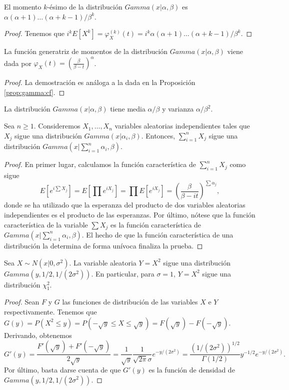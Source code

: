 \documentclass{article}
\begin{document}
\begin{cor}
    El momento $k$-ésimo de la distribución $Gamma(x|\alpha,\beta)$ es $\alpha (\alpha+1) \ldots (\alpha + k -1) / \beta^k$.
\end{cor}
\begin{proof}
    Tenemos que $i^k E[X^k]= \varphi_X^{(k)}(t) = i^k \alpha (\alpha+1) \ldots (\alpha + k -1) / \beta^k$.
\end{proof}

\begin{prop}
    La función generatriz de momentos de la distribución $Gamma(x|\alpha, \beta)$ viene dada por $\varphi_X(t) = \left(\frac{\beta}{\beta - t}\right)^\alpha$.
\end{prop}
\begin{proof}
    La demostración es análoga a la dada en la Proposición \ref{prop:gamma:cf}.
\end{proof}

\begin{cor}
    La distribución $Gamma(x|\alpha,\beta)$ tiene media $\alpha / \beta$ y varianza $\alpha / \beta^2$.
\end{cor}

\begin{prop}
    Sea $n \ge 1$. Consideremos $X_1, \ldots, X_n$ variables aleatorias independientes tales que $X_j$ sigue una distribución $Gamma(x|\alpha_i, \beta)$. Entonces, $\sum_{i=1}^n X_j$ sigue una distribución $Gamma(x|\sum_{i=1}^n \alpha_i, \beta)$.
\end{prop}
\begin{proof}
    En primer lugar, calculamos la función característica de $\sum_{i=1}^n X_j$ como sigue
    \[E[e^{i\sum X_j}] = E[\prod e^{iX_j}] = \prod E[e^{iX_j}] = \left(\frac{\beta}{\beta - it}\right)^{\sum \alpha_j},\]
    donde se ha utilizado que la esperanza del producto de dos variables aleatorias independientes es el producto de las esperanzas. Por último, nótese que la función característica de la variable $\sum X_j$ es la función característica de $Gamma(x|\sum_{i=1}^n \alpha_i, \beta)$. El hecho de que la función característica de una distribución la determina de forma unívoca finaliza la prueba.
\end{proof}

\begin{prop} \label{prop:normal-square}
    Sea $X \sim N(x|0,\sigma^2)$. La variable aleatoria $Y = X^2$ sigue una distribución \\ $Gamma(y,1/2,1/(2\sigma^2))$. En particular, para $\sigma = 1$, $Y = X^2$ sigue una distribución $\chi^2_1$.
\end{prop}
\begin{proof}
    Sean $F$ y $G$ las funciones de distribución de las variables $X$ e $Y$ respectivamente. Tenemos que $G(y) = P(X^2 \le y) = P(- \sqrt{y} \le X \le \sqrt{y}) = F(\sqrt{y}) - F(-\sqrt{y})$. Derivando, obtenemos
    \[G'(y) = \frac{F'(\sqrt{y}) + F'(-\sqrt{y})}{2\sqrt{y}} = \frac{1}{\sqrt{y}} \frac{1}{\sqrt{2\pi}\sigma} e^{-y/(2\sigma^2)} = \frac{(1/(2\sigma^2))^{1/2}}{\Gamma(1/2)} y^{-1/2} e^{-y/(2\sigma^2)}.\]
    Por último, basta darse cuenta de que $G'(y)$ es la función de densidad de $Gamma(y,1/2,1/(2\sigma^2))$.
\end{proof}
\end{document}
